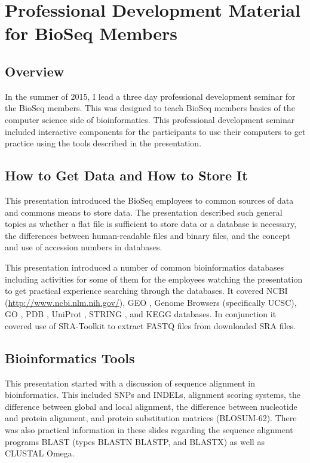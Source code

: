 \documentclass{report}
\begin{document}
\section{Professional Development Material for BioSeq Members}
\subsection{Overview}
In the summer of 2015, I lead a three day professional development seminar for the BioSeq members. This was designed to teach BioSeq members basics of the computer science side of bioinformatics. This professional development seminar included interactive components for the participants to use their computers to get practice using the tools described in the presentation.

\subsection{How to Get Data and How to Store It}
This presentation introduced the BioSeq employees to common sources of data and commons means to store data. The presentation described such general topics as whether a flat file is sufficient to store data or a database is necessary, the differences between human-readable files and binary files, and the concept and use of accession numbers in databases.

This presentation introduced a number of common bioinformatics databases including activities for some of them for the employees watching the presentation to get practical experience searching through the databases. It covered NCBI (\url{http://www.ncbi.nlm.nih.gov/}), GEO \cite{edgar2002gene}, Genome Browsers (specifically UCSC), GO \cite{ashburner2000gene}, PDB \cite{berman2000protein}, UniProt \cite{apweiler2004uniprot}, STRING \cite{von2003string}, and KEGG \cite{ogata1999kegg} databases. In conjunction it covered use of SRA-Toolkit \cite{leinonen2010sequence} to extract FASTQ files from downloaded SRA files.

\subsection{Bioinformatics Tools}
This presentation started with a discussion of sequence alignment in bioinformatics. This included SNPs and INDELs, alignment scoring systems, the difference between global and local alignment, the difference between nucleotide and protein alignment, and protein substitution matrices (BLOSUM-62). There was also practical information in these slides regarding the sequence alignment programs BLAST (types BLASTN BLASTP, and BLASTX) as well as CLUSTAL Omega.
\end{document}
